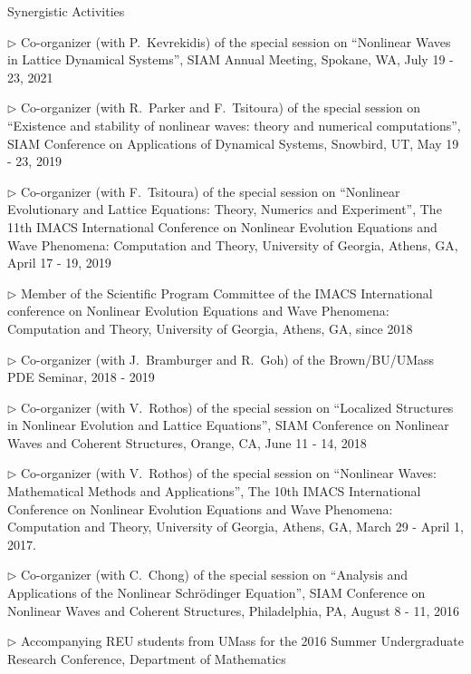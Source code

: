 \documentclass[10pt]{article} %
\newenvironment{outerlist}[1][\enskip\textbullet]%
        {\begin{itemize}[#1]}{\end{itemize}%
         \vspace{-.6\baselineskip}}
\newenvironment{innerlist}[1][\enskip\textbullet]%
        {\begin{compactitem}[#1]}{\end{compactitem}}
\begin{document}
\begin{section}{Synergistic Activities}
\begin{outerlist}
\begin{innerlist}
\item[$\triangleright$] Co-organizer (with P.~Kevrekidis) of the special session on 
                         ``Nonlinear Waves in Lattice Dynamical Systems'',
                         SIAM Annual Meeting, Spokane, WA, July 19 - 23, 2021
\item[$\triangleright$] Co-organizer (with R.~Parker and F.~Tsitoura) of the special session on
                        ``Existence and stability of nonlinear waves: theory and numerical computations'', 
                        SIAM Conference on Applications of Dynamical Systems, Snowbird, UT, May 19 - 23, 2019 
\item[$\triangleright$] Co-organizer (with F.~Tsitoura) of the special session on ``Nonlinear Evolutionary and Lattice Equations: Theory,
                        Numerics and Experiment'', The 11th IMACS International Conference on Nonlinear Evolution Equations and Wave Phenomena: 
                        Computation and Theory, University of Georgia, Athens, GA, April 17 - 19, 2019
\item[$\triangleright$] Member of the Scientific Program Committee of the IMACS International conference on Nonlinear Evolution Equations 
                        and Wave Phenomena: Computation and Theory, University of Georgia, Athens, GA, since 2018 
\item[$\triangleright$] Co-organizer (with J.~Bramburger and R.~Goh) of the Brown/BU/UMass PDE Seminar, 2018 - 2019
\item[$\triangleright$] Co-organizer (with V.~Rothos) of the special session on ``Localized Structures in Nonlinear Evolution
                        and Lattice Equations'', SIAM Conference on Nonlinear Waves and Coherent Structures, Orange, CA, June 11 - 14, 2018
\item[$\triangleright$] Co-organizer (with V.~Rothos) of the special session on ``Nonlinear Waves: Mathematical Methods and Applications'',
                        The 10th IMACS International Conference on Nonlinear Evolution Equations and Wave Phenomena: Computation and Theory, %
                        University of Georgia, Athens, GA, March 29 - April 1, 2017. 
\item[$\triangleright$] Co-organizer (with C.~Chong) of the special session on ``Analysis and Applications of the Nonlinear
Schr\"odinger Equation'', SIAM Conference on Nonlinear Waves and Coherent Structures, Philadelphia, PA, August 8 - 11, 2016
\item[$\triangleright$] Accompanying REU students from UMass for the 2016 Summer Undergraduate Research Conference, Department of Mathematics 

\end{innerlist}
\end{outerlist}
\end{section}
\end{document}
